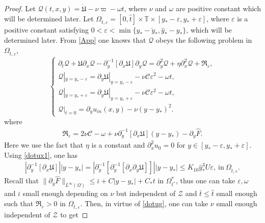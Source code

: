 \documentclass{amsart}
\numberwithin{equation}{section}
\begin{document}
\begin{proof}
Let $\mathcal{Q}(t,x,y)=\dot{\mathfrak{U}}-\nu\varpi-\omega t$, where $\nu$ and $\omega$ are positive constant which will be determined later.
Let $\Omega_{\hat{t},\varepsilon}=[0,\hat{t}]\times\mathbb{T}\times[y_{*}-\varepsilon,y_{*}+\varepsilon]$, where $\varepsilon$ is a positive constant satisfying $0<\varepsilon<\min\{y_{*}-\check{y}_{*},\hat{y}_{*}-y_{*}\}$, which will be determined later.
From \eqref{App} one knows that $\mathcal{Q}$ obeys the following problem in $\Omega_{\hat{t},\varepsilon}$,
\begin{equation}\label{Q}
\begin{cases}
\partial_{t}\mathcal{Q}
+\mathfrak{U}\partial_{x}\mathcal{Q}
-\partial_{y}^{-1}[\partial_{x}\mathfrak{U}]\partial_{y}\mathcal{Q}
=\partial_{y}^{2}\mathcal{Q}+\eta\partial_{x}^{2}\mathcal{Q}+\mathfrak{R}_{\varepsilon},\\
\mathcal{Q}|_{y=y_{*}-\varepsilon}=\partial_{y}\mathfrak{U}|_{y=y_{*}-\varepsilon}-\nu\mathcal{C}\varepsilon^{2}-\omega t,\\
\mathcal{Q}|_{y=y_{*}+\varepsilon}=\partial_{y}\mathfrak{U}|_{y=y_{*}+\varepsilon}-\nu\mathcal{C}\varepsilon^{2}-\omega t,\\
\mathcal{Q}|_{t=0}=\partial_{y}u_{in}(x,y)-\nu(y-y_{*})^{2}.
\end{cases}
\end{equation}
where
\begin{align*}
\mathfrak{R}_{\varepsilon}
= 2\nu\mathcal{C}
 -\omega+\nu\partial_{y}^{-1}[\partial_{x}\mathfrak{U}](y-y_{*})
 -\partial_{y}\hat{F}.
\end{align*}
Here we use the fact that $\eta$ is a constant and $\partial_{x}^{2}u_{0}=0$ for $y\in[y_{*}-\varepsilon,y_{*}+\varepsilon]$.
Using \eqref{dotux1}, one has
\begin{align*}
|\partial_{y}^{-1}[\partial_{x}\mathfrak{U}]||y-y_{*}|
=|\partial_{y}^{-1}[\partial_{y}^{-1}[\partial_{x}\partial_{y}\mathfrak{U}]]||y-y_{*}|
\leq K_{10}\hat{y}_{*}^{3}U\varepsilon,~\text{in}~\Omega_{\hat{t},\varepsilon}.
\end{align*}
Recall that $\|\partial_{y}\hat{F}\|_{L^{\infty}(\Omega)}\leq \bar{\iota}+C|y-y_{*}|+C_{*}t$ in $\Omega_{t^{*}}^{*}$,
thus one can take $\varepsilon,\omega$ and $\bar{\iota}$ small enough depending on $\nu$ but independent of $\mathcal{Z}$ and $\bar{t}\leq\hat{t}$ small enough such that $\mathfrak{R}_{\varepsilon}>0$ in $\Omega_{\bar{t},\varepsilon}$. Then, in virtue of \eqref{dotug}, one can take $\nu$ small enough independent of $\mathcal{Z}$ to get

\end{proof}
\end{document}
